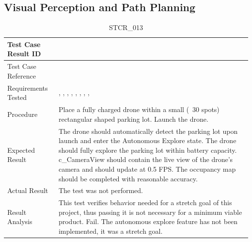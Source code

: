 \documentclass[12pt, titlepage]{article}
\begin{document}
\clearpage

\subsection{Visual Perception and Path Planning}

\begin{table}[!h]
\begin{center}
\caption {STCR\_013}
\label{tab:STCR_013}
\begin{tabular}{ | m{3.2cm} | m{12.2cm} | } 
\hline
Test Case Result ID & \nameref{tab:STCR_013} \\ 
\hline
Test Case Reference & \nameref{tab:STC_013}  \\ 
\hline
Requirements Tested & \nameref{GEN_005}, \nameref{GEN_006}, \nameref{STA_003}, \nameref{GEN_001}, \nameref{GEN_002}, \nameref{STA_003}, \nameref{TRANS_004}, \nameref{PERF_004}, \nameref{PERF_001} \\ 
\hline
Procedure & Place a fully charged drone within a small (~30 spots) rectangular shaped parking lot.  Launch the drone. \\
\hline
Expected Result & The drone should automatically detect the parking lot upon launch and enter the Autonomous Explore state. The drone should fully explore the parking lot within battery capacity. c\_CameraView should contain the live view of the drone's camera and should update at 0.5 FPS. The occupancy map should be completed with reasonable accuracy.  \\ 
\hline
Actual Result &  The test was not performed. \\
\hline
Result Analysis & This test verifies behavior needed for a stretch goal of this project, thus passing it is not necessary for a minimum viable product. 
Fail. The autonomous explore feature has not been implemented, it was a stretch goal.  \\ 
\hline
\end{tabular}
\end{center}
\end{table}
\end{document}
